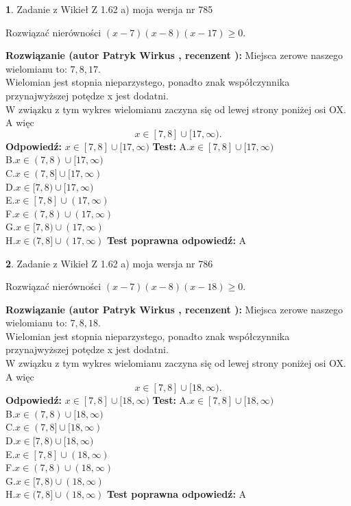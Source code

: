 \documentclass[12pt, a4paper]{article}
\theoremstyle{definition} %
\newtheorem{zad}{}
\newcommand{\zadStart}[1]{\begin{zad}#1\newline}
\newcommand{\zadStop}{\end{zad}}
\newcommand{\rozwStart}[2]{\noindent \textbf{Rozwiązanie (autor #1 , recenzent #2): }\newline}
\newcommand{\rozwStop}{\newline}
\newcommand{\odpStart}{\noindent \textbf{Odpowiedź:}\newline}
\newcommand{\odpStop}{\newline}
\newcommand{\testStart}{\noindent \textbf{Test:}\newline}
\newcommand{\testStop}{\newline}
\newcommand{\kluczStart}{\noindent \textbf{Test poprawna odpowiedź:}\newline}
\newcommand{\kluczStop}{\newline}
\begin{document}
\zadStart{Zadanie z Wikieł Z 1.62 a) moja wersja nr 785}

Rozwiązać nierówności $(x-7)(x-8)(x-17)\ge0$.
\zadStop
\rozwStart{Patryk Wirkus}{}
Miejsca zerowe naszego wielomianu to: $7, 8, 17$.\\
Wielomian jest stopnia nieparzystego, ponadto znak współczynnika przy\linebreak najwyższej potędze x jest dodatni.\\ W związku z tym wykres wielomianu zaczyna się od lewej strony poniżej osi OX. A więc $$x \in [7,8] \cup [17,\infty).$$
\rozwStop
\odpStart
$x \in [7,8] \cup [17,\infty)$
\odpStop
\testStart
A.$x \in [7,8] \cup [17,\infty)$\\
B.$x \in (7,8) \cup [17,\infty)$\\
C.$x \in (7,8] \cup [17,\infty)$\\
D.$x \in [7,8) \cup [17,\infty)$\\
E.$x \in [7,8] \cup (17,\infty)$\\
F.$x \in (7,8) \cup (17,\infty)$\\
G.$x \in [7,8) \cup (17,\infty)$\\
H.$x \in (7,8] \cup (17,\infty)$
\testStop
\kluczStart
A
\kluczStop



\zadStart{Zadanie z Wikieł Z 1.62 a) moja wersja nr 786}

Rozwiązać nierówności $(x-7)(x-8)(x-18)\ge0$.
\zadStop
\rozwStart{Patryk Wirkus}{}
Miejsca zerowe naszego wielomianu to: $7, 8, 18$.\\
Wielomian jest stopnia nieparzystego, ponadto znak współczynnika przy\linebreak najwyższej potędze x jest dodatni.\\ W związku z tym wykres wielomianu zaczyna się od lewej strony poniżej osi OX. A więc $$x \in [7,8] \cup [18,\infty).$$
\rozwStop
\odpStart
$x \in [7,8] \cup [18,\infty)$
\odpStop
\testStart
A.$x \in [7,8] \cup [18,\infty)$\\
B.$x \in (7,8) \cup [18,\infty)$\\
C.$x \in (7,8] \cup [18,\infty)$\\
D.$x \in [7,8) \cup [18,\infty)$\\
E.$x \in [7,8] \cup (18,\infty)$\\
F.$x \in (7,8) \cup (18,\infty)$\\
G.$x \in [7,8) \cup (18,\infty)$\\
H.$x \in (7,8] \cup (18,\infty)$
\testStop
\kluczStart
A
\kluczStop
\end{document}
